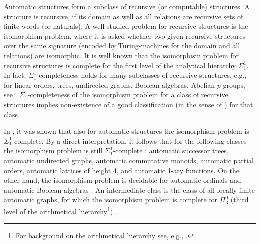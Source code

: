 \documentclass[envcountsame]{llncs}
\begin{document}
Automatic structures form a subclass of recursive (or computable) structures.
A structure is recursive, if its domain as well as all relations are recursive
sets of finite words (or naturals). A well-studied problem for
recursive structures is the isomorphism problem, where it is asked whether
two given recursive structures over the same signature
(encoded by Turing-machines for the domain
and all relations) are isomorphic. It is well known that the isomorphism
problem for recursive structures is complete for the first level of the analytical hierarchy
$\Sigma^1_1$. In fact, $\Sigma^1_1$-completeness holds for many subclasses
of recursive structures, e.g., for linear orders, trees, undirected graphs, Boolean
algebras, Abelian $p$-groups, see \cite{CaKni06,GonKn02}.
$\Sigma_1^1$-completeness of the isomorphism problem for a class of recursive
structures implies non-existence of a good classification
(in the sense of \cite{CaKni06}) for that class \cite{CaKni06}.

In \cite{KhoNRS07}, it was shown that also for automatic structures the
isomorphism problem is $\Sigma^1_1$-complete. By a direct interpretation,
it follows that for the following classes the isomorphism problem is
still $\Sigma^1_1$-complete \cite{Nie07}: automatic successor trees, automatic undirected
graphs, automatic commutative monoids, automatic partial orders, automatic
lattices of height 4, and automatic 1-ary functions.
On the other hand, the isomorphism problem is decidable for automatic ordinals
\cite{KhoRS05} and automatic Boolean algebras \cite{KhoNRS07}.
An intermediate class is the class of all locally-finite automatic graphs, for
which the isomorphism problem is complete for $\Pi^0_3$ (third level
of the arithmetical hierarchy\footnote{For background on the arithmetical 
hierarchy see, e.g., \cite{Rogers}.}) \cite{Rub04}.
\end{document}
